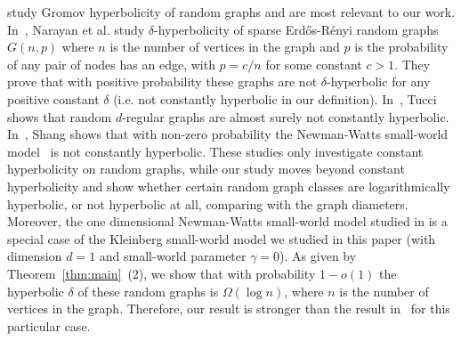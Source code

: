 \documentclass[11pt]{article}
\begin{document}
	\cite{NST12,Tucci12,Shang12} study Gromov hyperbolicity of random graphs and
	are most relevant to our work.
In~\cite{NST12}, Narayan et al. study $\delta$-hyperbolicity of 
	sparse Erd\H{o}s-R\'{e}nyi random graphs $G(n,p)$ where $n$ is the number of vertices in
	the graph and $p$ is the probability of any pair of nodes has an edge, with
	$p=c/n$ for some constant $c>1$.
They prove that with positive probability these graphs are not 
	$\delta$-hyperbolic for any positive constant $\delta$ (i.e. not constantly hyperbolic
	in our definition).
In~\cite{Tucci12}, Tucci shows that random $d$-regular graphs are almost surely
	not constantly hyperbolic.
In~\cite{Shang12}, Shang shows that with non-zero probability the 
	Newman-Watts small-world model~\cite{NW99} is not constantly hyperbolic.
These studies only investigate constant hyperbolicity on random graphs, while our study moves
	beyond constant hyperbolicity and show whether certain random graph classes are logarithmically
	hyperbolic, or not hyperbolic at all, comparing with the graph diameters.
Moreover, the one dimensional Newman-Watts small-world model studied in
	\cite{Shang12} is a special case of the Kleinberg small-world model we studied in this
	paper (with dimension $d=1$ and small-world parameter $\gamma=0$).
As given by Theorem~\ref{thm:main}~(2), we show that with probability $1-o(1)$ the hyperbolic
	$\delta$ of these random graphs is $\Omega(\log n)$, where $n$ is the number of vertices
	in the graph.
Therefore, our result is stronger than the result in~\cite{Shang12} for this particular case.
\end{document}
